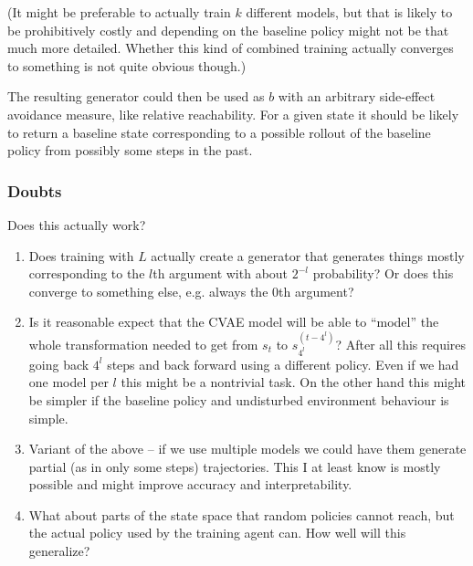 \documentclass{article}
\newcommand{\baseline}{b}
\begin{document}
		(It might be preferable to actually train $k$ different models, but that is likely to
		be prohibitively costly and depending on the baseline policy might not be that much more detailed.
	 Whether this kind of combined training actually converges to something is not quite obvious though.)

		The resulting generator could then be used as $\baseline$ with an arbitrary side-effect avoidance
		measure, like relative reachability. For a given state it should be likely to return
		a baseline state corresponding to a possible rollout of the baseline policy from possibly some
		steps in the past.

		\subsubsection{Doubts}
		 Does this actually work?
			\begin{enumerate}
				\item Does training with $L$ actually create a generator that
					generates things mostly corresponding to the $l$th argument with about $2^{-l}$
					probability? Or does this converge to something else, e.g. always the $0$th argument?
				\item Is it reasonable expect that the CVAE model will be able to ``model'' the whole
					transformation needed to get from $s_t$ to $s^{\left( t-4^l \right)}_{4^l}$?
					After all this requires going back $4^l$ steps and back forward using a different policy.
					Even if we had one model per $l$ this might be a nontrivial task. On the other hand this might
					be simpler if the baseline policy and undisturbed environment behaviour is simple.
				\item Variant of the above -- if we use multiple models we could have them generate
					partial (as in only some steps) trajectories. This I at least know is mostly possible
					and might improve accuracy and interpretability.
				\item What about parts of the state space that random policies cannot reach, but the
					actual policy used by the training agent can. How well will this generalize?
			\end{enumerate}
\appendix
\end{document}
